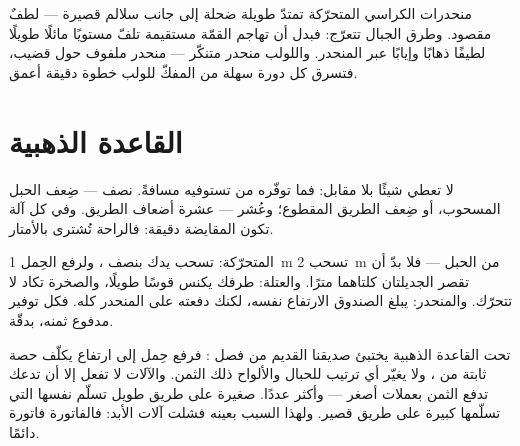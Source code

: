 \begin{example}\label{ex:g5:simple-machines:ramps}
منحدرات الكراسي المتحرّكة تمتدّ طويلة ضحلة إلى جانب سلالم قصيرة
--- لطفٌ مقصود. وطرق الجبال تتعرّج: فبدل أن تهاجم القمّة
مستقيمة تلفّ مستويًا مائلًا طويلًا لطيفًا ذهابًا وإيابًا عبر
المنحدر. واللولب منحدر متنكّر --- منحدر ملفوف حول قضيب، فتسرق
كل دورة سهلة من المفكّ للولب خطوة دقيقة أعمق.
\end{example}

\section{القاعدة الذهبية}

\begin{proposition}\label{prop:g5:simple-machines:golden}
لا تعطي  شيئًا بلا مقابل: فما توفّره من  تستوفيه
مسافةً. نصف  --- ضِعف الحبل المسحوب، أو ضِعف الطريق
المقطوع؛ وعُشر  --- عشرة أضعاف الطريق. وفي كل آلة تكون
المقايضة دقيقة: فالراحة تُشترى بالأمتار.
\end{proposition}

\begin{example}\label{ex:g5:simple-machines:check}
 المتحرّكة: تسحب يدك بنصف ، ولرفع الحِمل \qty{1}{m}
تسحب \qty{2}{m} من الحبل --- فلا بدّ أن تقصر الجديلتان كلتاهما
مترًا. والعتلة: طرفك يكنس قوسًا طويلًا، والصخرة تكاد لا تتحرّك.
والمنحدر: يبلغ الصندوق الارتفاع نفسه، لكنك دفعته على المنحدر
كله. فكل توفير مدفوع ثمنه، بدقّة.
\end{example}

\begin{remark}\label{rem:g5:simple-machines:whygolden}
تحت القاعدة الذهبية يختبئ صديقنا القديم من فصل : فرفع
حِمل إلى ارتفاع يكلّف حصة ثابتة من ، ولا يغيّر أي ترتيب
للحبال والألواح ذلك الثمن. والآلات لا تفعل إلا أن تدعك تدفع
الثمن بعملات أصغر --- وأكثر عددًا.  صغيرة على طريق طويل
تسلّم  نفسها التي تسلّمها  كبيرة على طريق قصير. ولهذا
السبب بعينه فشلت آلات الأبد: فالفاتورة فاتورة دائمًا.
\end{remark}

